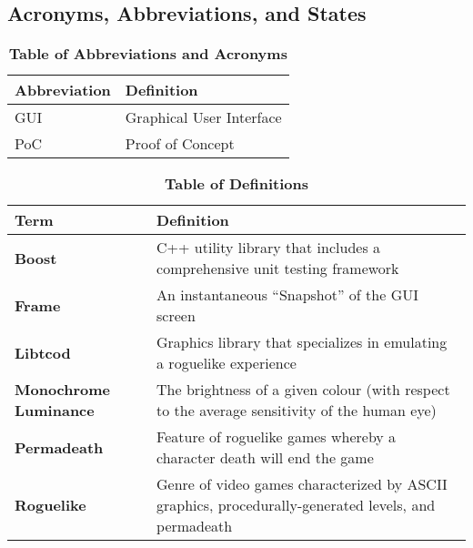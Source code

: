 \documentclass[12pt, titlepage]{article}
\begin{document}
	\subsection{Acronyms, Abbreviations, and States}
		
		\begin{table}[H]
			\centering
			\caption{\textbf{Table of Abbreviations and Acronyms}}
			\label{TableAbbreviations}
			\bigskip
			\begin{tabularx}{\textwidth}{p{3cm}X}
				\toprule
				\textbf{Abbreviation} & \textbf{Definition} \\
				\midrule
				GUI & Graphical User Interface\\
				PoC & Proof of Concept\\
				\bottomrule
			\end{tabularx}
		\end{table}

		\begin{table}[H]
			\centering
			\caption{\textbf{Table of Definitions}}
			\label{TableDefinitions}
			\bigskip
			\begin{tabularx}{\textwidth}{p{3.5cm}X}
				\toprule
				\textbf{Term} & \textbf{Definition}\\
				\midrule
				\textbf{Boost} & C++ utility library that includes a comprehensive unit testing framework\\
				\textbf{Frame} & An instantaneous ``Snapshot'' of the GUI screen\\
				\textbf{Libtcod} & Graphics library that specializes in emulating a roguelike experience\\
				\textbf{Monochrome Luminance} & The brightness of a given colour (with respect to the average sensitivity of the human eye)\\
				\textbf{Permadeath} & Feature of roguelike games whereby a character death will end the game\\
				\textbf{Roguelike} & Genre of video games characterized by ASCII graphics, procedurally-generated levels, and permadeath\\
				\bottomrule
			\end{tabularx}
		\end{table}	
\end{document}
